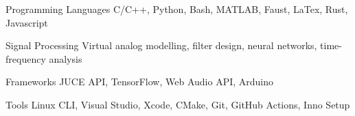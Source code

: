

\begin{cvskills}

    \cvskill
    {Programming Languages} %
    {C/C++, Python, Bash, MATLAB, Faust, LaTex, Rust, Javascript} %

    \cvskill
    {Signal Processing} %
    {Virtual analog modelling, filter design, neural networks, time-frequency analysis} %

    \cvskill
    {Frameworks} %
    {JUCE API, TensorFlow, Web Audio API, Arduino} %

    \cvskill
    {Tools} %
    {Linux CLI, Visual Studio, Xcode, CMake, Git, GitHub Actions, Inno Setup} %

\end{cvskills}
